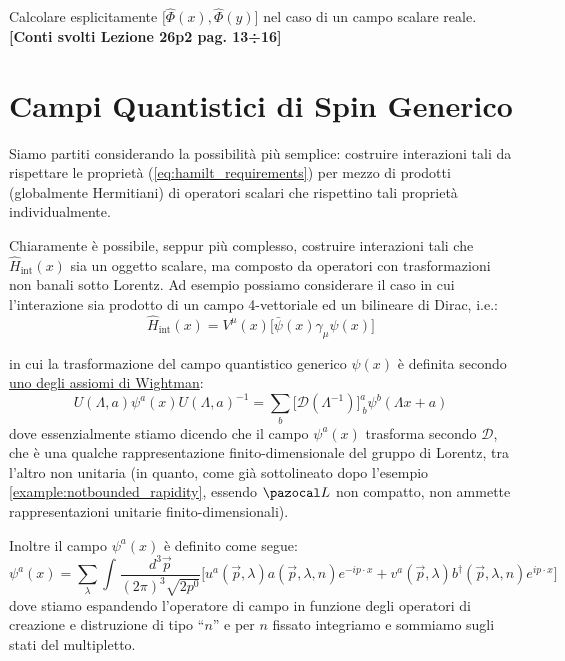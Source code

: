 \documentclass[../main.tex]{subfiles}
\begin{document}
\begin{exercise}
    Calcolare esplicitamente $\big[ \hat{\Phi}(x),\hat{\Phi}(y) \big]$ nel caso di un campo scalare reale. \textbf{[Conti svolti Lezione 26p2 pag. 13÷16]}
\end{exercise}

\section{Campi Quantistici di Spin Generico}
Siamo partiti considerando la possibilità più semplice: costruire interazioni tali da rispettare le proprietà (\ref{eq:hamilt_requirements}) per mezzo di prodotti (globalmente Hermitiani) di operatori scalari che rispettino tali proprietà individualmente.

Chiaramente è possibile, seppur più complesso, costruire interazioni tali che $\hat{H}_\text{int}(x)$ sia un oggetto scalare, ma composto da operatori con trasformazioni non banali sotto Lorentz. Ad esempio possiamo considerare il caso in cui l'interazione sia prodotto di un campo 4-vettoriale ed un bilineare di Dirac, i.e.:
\[
\hat{H}_\text{int}(x) = V^\mu(x)\big[\bar\psi(x)\gamma_\mu\psi(x)\big]
\]

in cui la trasformazione del campo quantistico generico $\psi(x)$ è definita secondo \href{https://en.wikipedia.org/wiki/Wightman_axioms#W2_(transformation_law_of_the_field)}{uno degli assiomi di Wightman}:
\begin{equation}
    \boxed{U(\Lambda, a)\psi^a(x)U(\Lambda, a)^{-1} = \sum_b\big[\mathscr D(\Lambda^{-1})\big]^a_{~b}\psi^b(\Lambda x + a)}
    \label{eq:wightman_transform_axiom}
\end{equation}
dove essenzialmente stiamo dicendo che il campo $\psi^a(x)$ trasforma secondo $\mathscr D$, che è una qualche rappresentazione finito-dimensionale del gruppo di Lorentz, tra l'altro non unitaria (in quanto, come già sottolineato dopo l'esempio \ref{example:notbounded_rapidity}, essendo $\pazocal L$ non compatto, non ammette rappresentazioni unitarie finito-dimensionali).

Inoltre il campo $\psi^a(x)$ è definito come segue:
\begin{equation}
    \boxed{
    \psi^a(x) = \sum_\lambda\int_{}\frac{d^3\Vec p}{(2\pi)^3\sqrt{2p^0}}\big[u^a(\Vec{p},\lambda)a(\Vec{p},\lambda,n)e^{-ip\cdot x} + v^a(\Vec{p},\lambda)b^\dagger(\Vec{p},\lambda,n)e^{ip\cdot x}\big]
    }
    \label{eq:generic_quantum_field}
\end{equation}
dove stiamo espandendo l'operatore di campo in funzione degli operatori di creazione e distruzione di tipo “$n$” e per $n$ fissato integriamo e sommiamo sugli stati del multipletto.
\end{document}
